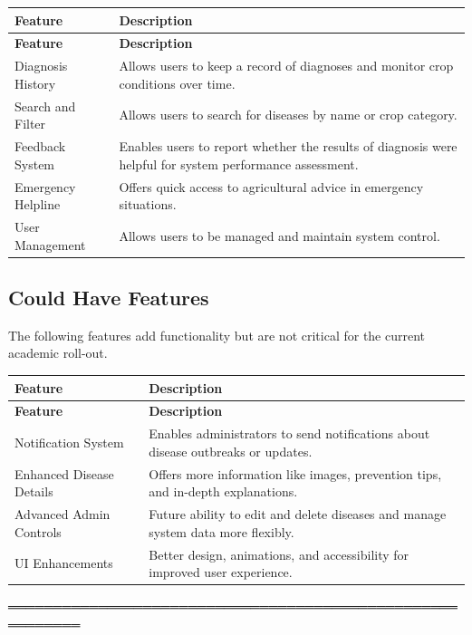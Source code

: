 \documentclass[12pt,a4paper]{article}
\begin{document}
\begin{longtable}{|p{4cm}|p{9cm}|}
\hline
\rowcolor{lightgreen}
\textbf{Feature} & \textbf{Description} \\
\hline
\endfirsthead

\hline
\rowcolor{lightgreen}
\textbf{Feature} & \textbf{Description} \\
\hline
\endhead

Diagnosis History &
Allows users to keep a record of diagnoses and monitor crop conditions over time. \\
\hline

Search and Filter &
Allows users to search for diseases by name or crop category. \\
\hline

Feedback System &
Enables users to report whether the results of diagnosis were helpful for system performance assessment. \\
\hline

Emergency Helpline &
Offers quick access to agricultural advice in emergency situations. \\
\hline

User Management &
Allows users to be managed and maintain system control. \\
\hline

\end{longtable}


\subsection{Could Have Features}

The following features add functionality but are not critical for the current academic roll-out.

\begin{longtable}{|p{4cm}|p{9cm}|}
\hline
\rowcolor{lightgreen}
\textbf{Feature} & \textbf{Description} \\
\hline
\endfirsthead

\hline
\rowcolor{lightgreen}
\textbf{Feature} & \textbf{Description} \\
\hline
\endhead

Notification System &
Enables administrators to send notifications about disease outbreaks or updates. \\
\hline

Enhanced Disease Details &
Offers more information like images, prevention tips, and in-depth explanations. \\
\hline

Advanced Admin Controls &
Future ability to edit and delete diseases and manage system data more flexibly. \\
\hline

UI Enhancements &
Better design, animations, and accessibility for improved user experience. \\
\hline

\end{longtable}══════════════════════════════════════════════════════════
\end{document}
